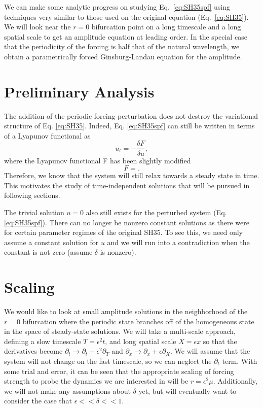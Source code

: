 \documentclass[api,pof,pre,12pt,a4paper]{revtex4-1}
\newcommand{\beqn}{\begin{equation}}
\newcommand{\eeqn}{\end{equation}}
\begin{document}
We can make some analytic progress on studying Eq.~\ref{eq:SH35spf} using techniques very similar to those used on the original equation (Eq.~\ref{eq:SH35}). We will look near the $r=0$ bifurcation point on a long timescale and a long spatial scale to get an amplitude equation at leading order.  In the special case that the periodicity of the forcing is half that of the natural wavelength, we obtain a parametrically forced Ginsburg-Landau equation for the amplitude.  


\section{Preliminary Analysis}
The addition of the periodic forcing perturbation does not destroy the variational structure of Eq. \ref{eq:SH35}.  Indeed, Eq. \ref{eq:SH35spf} can still be written in terms of a Lyapunov functional as 
\beqn
u_t=-\frac{\delta F}{\delta u},
\eeqn
where the Lyapunov functional F has been slightly modified
\beqn
F=.
\eeqn
Therefore, we know that the system will still relax towards a steady state in time.  This motivates the study of time-independent solutions that will be pursued in following sections.

The trivial solution $u=0$ also still exists for the perturbed system (Eq. \ref{eq:SH35spf}). There can no longer be nonzero constant solutions as there were for certain parameter regimes of the original SH35.  To see this, we need only assume a constant solution for $u$ and we will run into  a contradiction when the constant is not zero (assume $\delta$ is nonzero).  


\section{Scaling}
We would like to look at small amplitude solutions in the neighborhood of the $r=0$ bifurcation where the periodic state branches off of the homogeneous state in the space of steady-state solutions.  We will take a multi-scale approach, defining a slow timescale $T=\epsilon^2t$, and long spatial scale $X=\epsilon x$ so that the derivatives become $\partial_t \rightarrow \partial_t+\epsilon^2\partial_T$ and $\partial_x \rightarrow \partial_x+\epsilon\partial_X$.  We will assume that the system will not change on the fast timescale, so we can neglect the $\partial_t$ term. With some trial and error, it can be seen that the appropriate scaling of forcing strength to probe the dynamics we are interested in will be $r=\epsilon^2 \mu$.     Additionally, we will not make any assumptions about $\delta$ yet, but will eventually want to consider the case that $\epsilon <<\delta <<1$.
\end{document}

